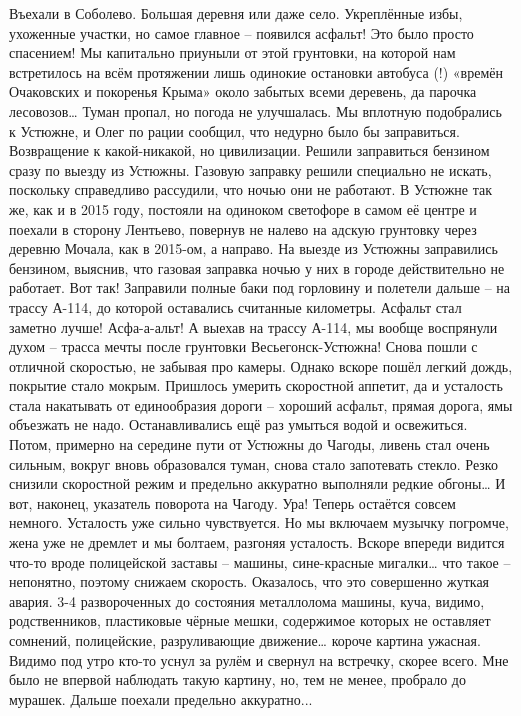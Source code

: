 Въехали в Соболево. Большая деревня или даже село. Укреплённые избы, ухоженные участки, но самое главное – появился асфальт! Это было просто спасением! Мы капитально приуныли от этой грунтовки, на которой нам встретилось на всём протяжении лишь одинокие остановки автобуса (!) «времён Очаковских и покоренья Крыма» около забытых всеми деревень, да парочка лесовозов… Туман пропал, но погода не улучшалась. Мы вплотную подобрались к Устюжне, и Олег по рации сообщил, что недурно было бы заправиться. Возвращение к какой-никакой, но цивилизации. Решили заправиться бензином сразу по выезду из Устюжны. Газовую заправку решили специально не искать, поскольку справедливо рассудили, что ночью они не работают.
В Устюжне так же, как и в 2015 году, постояли на одиноком светофоре в самом её центре и поехали в сторону Лентьево, повернув не налево на адскую грунтовку через деревню Мочала, как в 2015-ом, а направо. На выезде из Устюжны заправились бензином, выяснив, что газовая заправка ночью у них в городе действительно не работает. Вот так! Заправили полные баки под горловину и полетели дальше – на трассу А-114, до которой оставались считанные километры. Асфальт стал заметно лучше! Асфа-а-альт! А выехав на трассу А-114, мы вообще воспрянули духом – трасса мечты после грунтовки Весьегонск-Устюжна! Снова пошли с отличной скоростью, не забывая про камеры. Однако вскоре пошёл легкий дождь, покрытие стало мокрым. Пришлось умерить скоростной аппетит, да и усталость стала накатывать от единообразия дороги – хороший асфальт, прямая дорога, ямы объезжать не надо. Останавливались ещё раз умыться водой и освежиться. Потом, примерно на середине пути от Устюжны до Чагоды, ливень стал очень сильным, вокруг вновь образовался туман, снова стало запотевать стекло. Резко снизили скоростной режим и предельно аккуратно выполняли редкие обгоны…
И вот, наконец, указатель поворота на Чагоду. Ура! Теперь остаётся совсем немного. Усталость уже сильно чувствуется. Но мы включаем музычку погромче, жена уже не дремлет и мы болтаем, разгоняя усталость. Вскоре впереди видится что-то вроде полицейской заставы – машины, сине-красные мигалки… что такое – непонятно, поэтому снижаем скорость. Оказалось, что это совершенно жуткая авария. 3-4 развороченных до состояния металлолома машины, куча, видимо, родственников, пластиковые чёрные мешки, содержимое которых не оставляет сомнений, полицейские, разруливающие движение… короче картина ужасная. Видимо под утро кто-то уснул за рулём и свернул на встречку, скорее всего. Мне было не впервой наблюдать такую картину, но, тем не менее, пробрало до мурашек. Дальше поехали предельно аккуратно...
